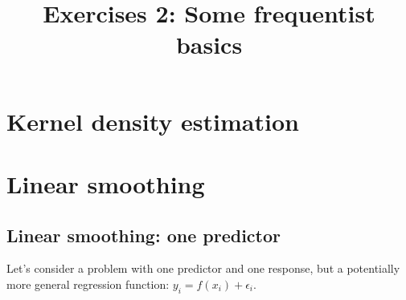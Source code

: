 \documentclass{mynotes}
\title[Exercises 2 $\cdot$ SSC 384D]{Exercises 2: Some frequentist basics}
\date{}  %
\begin{document}
\maketitle%


\section{Kernel density estimation}

\newpage

\section{Linear smoothing}

\subsection{Linear smoothing: one predictor}

Let's consider a problem with one predictor and one response, but a potentially more general regression function: $y_i = f(x_i) + \epsilon_i$.
\end{document}
